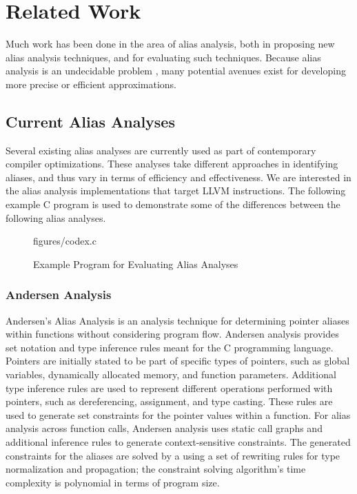 \chapter{Related Work}

Much work has been done in the area of alias analysis, both in proposing new alias analysis techniques, and for evaluating such techniques. Because alias analysis is an undecidable problem \cite{undecidable}, many potential avenues exist for developing more precise or efficient approximations.

\section{Current Alias Analyses}
Several existing alias analyses are currently used as part of contemporary compiler optimizations. These analyses take different approaches in identifying aliases, and thus vary in terms of efficiency and effectiveness. We are interested in the alias analysis implementations that target LLVM instructions. The following example C program is used to demonstrate some of the differences between the following alias analyses.

\begin{figure} [h]
    {figures/codex.c}
   \caption{Example Program for Evaluating Alias Analyses}
   \label{fig:codex}
\end{figure}

\subsection{Andersen Analysis}
Andersen's Alias Analysis \cite{Andersen} is an analysis technique for determining pointer aliases within functions without considering program flow. Andersen analysis provides set notation and type inference rules meant for the C programming language. Pointers are initially stated to be part of specific types of pointers, such as global variables, dynamically allocated memory, and function parameters. Additional type inference rules are used to represent different operations performed with pointers, such as dereferencing, assignment, and type casting. These rules are used to generate set constraints for the pointer values within a function. For alias analysis across function calls, Andersen analysis uses static call graphs and additional inference rules to generate context-sensitive constraints. The generated constraints for the aliases are solved by a using a set of rewriting rules for type normalization and propagation; the constraint solving algorithm's time complexity is polynomial in terms of program size.

